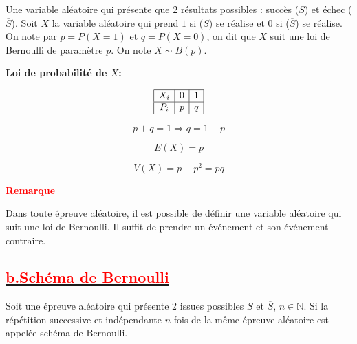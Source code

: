 \documentclass[12pt]{article}
\begin{document}
Une variable aléatoire qui présente que 2 résultats possibles : succès (\(S\)) et échec (\(\overline{S}\)). 
Soit \(X\) la variable aléatoire qui prend \(1\) si (\(S\)) se réalise et \(0\) si (\(\overline{S}\)) se réalise.
On note par \(p = P(X = 1)\) et \(q = P(X = 0)\), on dit que \(X\) suit une loi de Bernoulli de paramètre \(p\).
On note \(X \sim B(p)\).

\textbf{Loi de probabilité de \( X \):}

\[
\begin{array}{|c|c|c|}
\hline
X_i & 0 & 1 \\
\hline
P_i & p & q \\
\hline
\end{array}
\]

\[
p + q = 1 \Rightarrow q = 1 - p
\]

\[
E(X) = p
\]

\[
V(X) = p - p^2 = p q
\]

\underline{\textbf{\textcolor{red}{Remarque}}}

Dans toute épreuve aléatoire, il est possible de définir une variable aléatoire qui suit une loi de Bernoulli. Il suffit de prendre un événement et son événement contraire.

\subsection*{\underline{\textbf{\textcolor{red}{b.Schéma de Bernoulli}}}}

Soit une épreuve aléatoire qui présente 2 issues possibles \( S \) et \( \overline{S} \), \( n \in \mathbb{N} \). Si la répétition successive et indépendante \( n \) fois de la même épreuve aléatoire est appelée schéma de Bernoulli.
\end{document}
